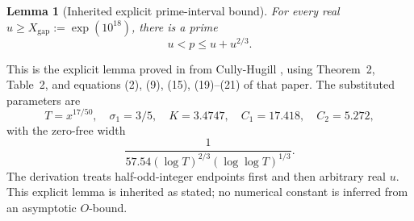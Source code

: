 \documentclass[11pt,a4paper]{article}
\newtheorem{lemma}[theorem]{Lemma}\newtheorem{proposition}[theorem]{Proposition}
\theoremstyle{definition}\newtheorem{definition}[theorem]{Definition}
\theoremstyle{remark}\newtheorem{remark}[theorem]{Remark}
\begin{document}
\begin{lemma}[Inherited explicit prime-interval bound]\label{R07:lem:gap}
For every real $u\ge X_{\mathrm{gap}}:=\exp(10^{18})$, there is a prime
\[
                         u<p\le u+u^{2/3}.
\]
\end{lemma}

This is the explicit lemma proved in \cite[Section~4]{P01}
from Cully-Hugill \cite{CH}, using Theorem~2, Table~2, and
equations (2), (9), (15), (19)--(21) of that paper.
The substituted parameters are
\[
 T=x^{17/50},\quad \sigma_1=3/5,\quad
 K=3.4747,\quad C_1=17.418,\quad C_2=5.272,
\]
with the zero-free width
\[
 \frac{1}{57.54(\log T)^{2/3}(\log\log T)^{1/3}}.
\]
The derivation treats half-odd-integer endpoints first and then arbitrary
real $u$. This explicit lemma is inherited as stated; no numerical
constant is inferred from an asymptotic $O$-bound.
\end{document}
